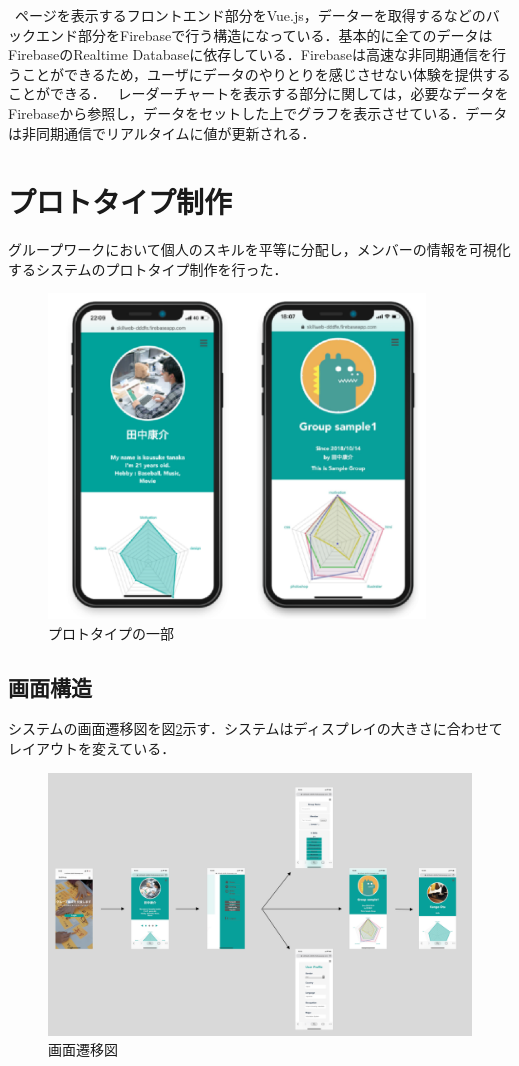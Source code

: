 \documentclass{funthesis}
\begin{document}
\ ページを表示するフロントエンド部分をVue.js，データーを取得するなどのバックエンド部分をFirebaseで行う構造になっている．基本的に全てのデータはFirebaseのRealtime Databaseに依存している．Firebaseは高速な非同期通信を行うことができるため，ユーザにデータのやりとりを感じさせない体験を提供することができる．
\ レーダーチャートを表示する部分に関しては，必要なデータをFirebaseから参照し，データをセットした上でグラフを表示させている．データは非同期通信でリアルタイムに値が更新される．


\section{プロトタイプ制作}

グループワークにおいて個人のスキルを平等に分配し，メンバーの情報を可視化するシステムのプロトタイプ制作を行った．
\begin{figure}[H]
 \centering
   \includegraphics[width=100mm]{figures/gamen.png}
 \caption{プロトタイプの一部}
 \label{gamen}
\end{figure}

\subsection{画面構造}
システムの画面遷移図を図\ref{gamensenni}示す．システムはディスプレイの大きさに合わせてレイアウトを変えている．
\begin{figure}[H]
 \centering
   \includegraphics[width=150mm]{figures/gamennsennizu2.png}
 \caption{画面遷移図}
 \label{gamensenni}
\end{figure}
\end{document}
